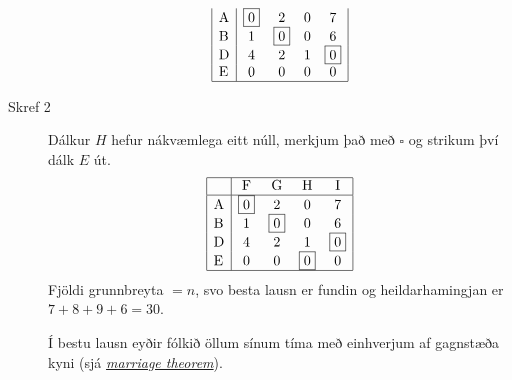 \begin{lausn}
\begin{description}
\[\begin{array}{|l|cccc|}
    \textrm{A} & \fbox{0} & 2 & 0 & 7\\
    \textrm{B} & 1 & \fbox{0} & 0 & 6 \\
    \textrm{D} & 4 & 2 & 1 & \fbox{0} \\
    \textrm{E} & 0 & 0 & 0 & 0  \\ \hline 
   \end{array}\]
\item[Skref 2]Dálkur $H$  hefur nákvæmlega eitt núll, merkjum það með $\square$ og strikum því dálk $E$ út.
\[ \begin{array}{|l|cccc|}\hline & \textrm{F} & \textrm{G} & \textrm{H} & \textrm{I} \\ \hline
    \textrm{A} & \fbox{0} & 2 & 0 & 7\\
    \textrm{B} & 1 & \fbox{0} & 0 & 6 \\
    \textrm{D} & 4 & 2 & 1 & \fbox{0} \\
    \textrm{E} & 0 & 0 & \fbox{0} & 0  \\ \hline 
   \end{array}\]
   Fjöldi grunnbreyta $=n$, svo besta lausn er fundin og heildarhamingjan er $7+8+9+6=30$.
\begin{aths}Í bestu lausn eyðir fólkið öllum sínum tíma með ein\-hverjum af gagnstæða kyni (sjá \href{http://en.wikipedia.org/wiki/Hall's_marriage_theorem}{\emph{marriage theorem}}).\end{aths}

\end{description}
\end{lausn}

